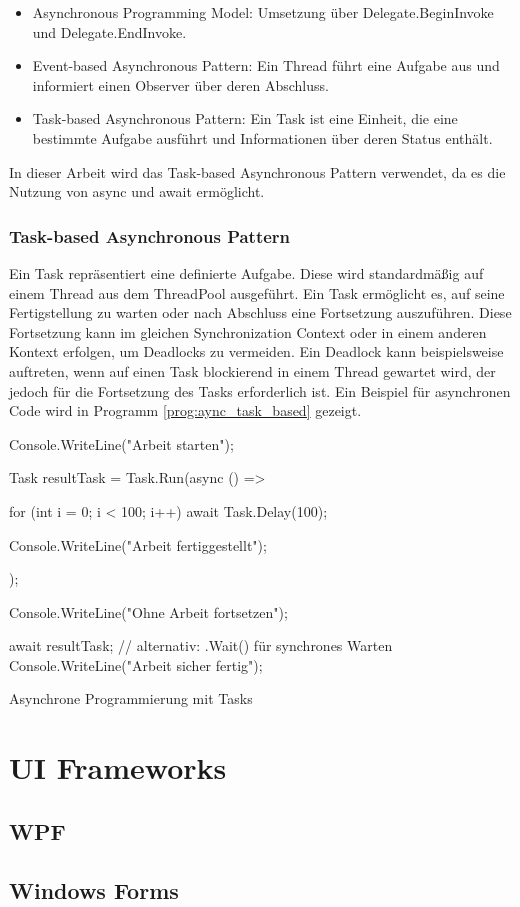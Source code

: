 \begin{itemize}
    \item Asynchronous Programming Model: Umsetzung über Delegate.BeginInvoke und Delegate.EndInvoke.
    \item Event-based Asynchronous Pattern: Ein Thread führt eine Aufgabe aus und informiert einen Observer über deren Abschluss.
    \item Task-based Asynchronous Pattern: Ein Task ist eine Einheit, die eine bestimmte Aufgabe ausführt und Informationen über deren Status enthält.
\end{itemize}

In dieser Arbeit wird das Task-based Asynchronous Pattern verwendet, da es die Nutzung von async und await ermöglicht.

\subsubsection{Task-based Asynchronous Pattern}
Ein Task \cite{Microsoft_TaskClass} repräsentiert eine definierte Aufgabe. Diese wird standardmäßig auf einem Thread aus dem ThreadPool ausgeführt. Ein Task ermöglicht es, auf seine Fertigstellung zu warten oder nach Abschluss eine Fortsetzung auszuführen. Diese Fortsetzung kann im gleichen Synchronization Context oder in einem anderen Kontext erfolgen, um Deadlocks zu vermeiden. Ein Deadlock kann beispielsweise auftreten, wenn auf einen Task blockierend in einem Thread gewartet wird, der jedoch für die Fortsetzung des Tasks erforderlich ist. Ein Beispiel für asynchronen Code wird in Programm \ref{prog:aync_task_based} gezeigt.

\begin{program}[H]
\begin{CsCode}
Console.WriteLine("Arbeit starten");

Task resultTask = Task.Run(async () =>
{
    for (int i = 0; i < 100; i++)
        await Task.Delay(100);

    Console.WriteLine("Arbeit fertiggestellt");
});

Console.WriteLine("Ohne Arbeit fortsetzen");

await resultTask; // alternativ: .Wait() für synchrones Warten
Console.WriteLine("Arbeit sicher fertig");
\end{CsCode}
\caption{Asynchrone Programmierung mit Tasks}
\label{prog:aync_task_based}
\end{program}

\section{UI Frameworks}
\label{sec:ui_frameworks}

\subsection{WPF}
\label{subsec:WPF}

\subsection{Windows Forms}
\label{subsec:Winforms}


